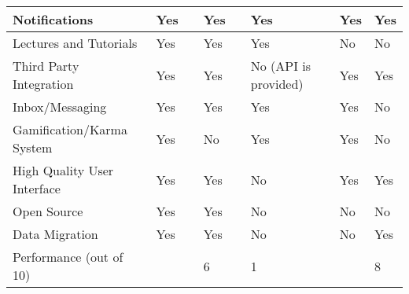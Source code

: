 \begin{table}[ht]
{\begin{tabular}{llllllll}
        \multicolumn{1}{|l|}{Notifications}               & \multicolumn{1}{l|}{Yes} & \multicolumn{1}{l|}{} & \multicolumn{1}{l|}{Yes} & \multicolumn{1}{l|}{} & \multicolumn{1}{l|}{Yes}                       & \multicolumn{1}{l|}{Yes} & \multicolumn{1}{l|}{Yes} \\ \hline
        \multicolumn{1}{|l|}{Lectures and Tutorials}      & \multicolumn{1}{l|}{Yes} & \multicolumn{1}{l|}{} & \multicolumn{1}{l|}{Yes} & \multicolumn{1}{l|}{} & \multicolumn{1}{l|}{Yes}                       & \multicolumn{1}{l|}{No} & \multicolumn{1}{l|}{No} \\ \hline
        \multicolumn{1}{|l|}{Third Party Integration}     & \multicolumn{1}{l|}{Yes} & \multicolumn{1}{l|}{} & \multicolumn{1}{l|}{Yes} & \multicolumn{1}{l|}{} & \multicolumn{1}{l|}{No (API is provided)}      & \multicolumn{1}{l|}{Yes} & \multicolumn{1}{l|}{Yes} \\ \hline
        \multicolumn{1}{|l|}{Inbox/Messaging}             & \multicolumn{1}{l|}{Yes} & \multicolumn{1}{l|}{} & \multicolumn{1}{l|}{Yes} & \multicolumn{1}{l|}{} & \multicolumn{1}{l|}{Yes}                       & \multicolumn{1}{l|}{Yes} & \multicolumn{1}{l|}{No} \\ \hline
        \multicolumn{1}{|l|}{Gamification/Karma System}   & \multicolumn{1}{l|}{Yes} & \multicolumn{1}{l|}{} & \multicolumn{1}{l|}{No} & \multicolumn{1}{l|}{} & \multicolumn{1}{l|}{Yes}                       & \multicolumn{1}{l|}{Yes} & \multicolumn{1}{l|}{No} \\ \hline
        \multicolumn{1}{|l|}{High Quality User Interface} & \multicolumn{1}{l|}{Yes} & \multicolumn{1}{l|}{} & \multicolumn{1}{l|}{Yes} & \multicolumn{1}{l|}{} & \multicolumn{1}{l|}{No}                        & \multicolumn{1}{l|}{Yes} & \multicolumn{1}{l|}{Yes} \\ \hline
        \multicolumn{1}{|l|}{Open Source}                 & \multicolumn{1}{l|}{Yes} & \multicolumn{1}{l|}{} & \multicolumn{1}{l|}{Yes} & \multicolumn{1}{l|}{} & \multicolumn{1}{l|}{No}                        & \multicolumn{1}{l|}{No} & \multicolumn{1}{l|}{No} \\ \hline
        \multicolumn{1}{|l|}{Data Migration}              & \multicolumn{1}{l|}{Yes} & \multicolumn{1}{l|}{} & \multicolumn{1}{l|}{Yes} & \multicolumn{1}{l|}{} & \multicolumn{1}{l|}{No}                        & \multicolumn{1}{l|}{No} & \multicolumn{1}{l|}{Yes} \\ \hline
        Performance (out of 10)                           &                       &                       & 6                      &                       & 1                                              &                       & 8                      \\ \hline
    \end{tabular}}
\end{table}







